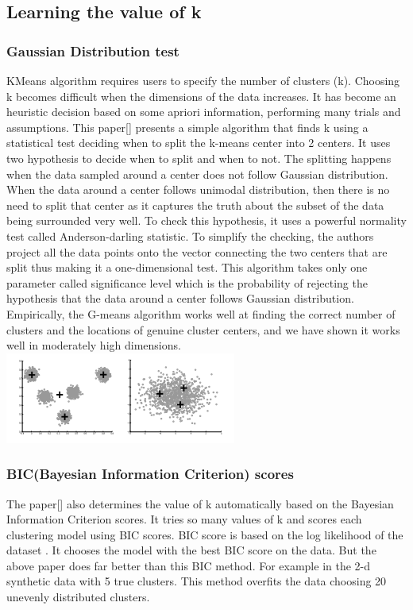 \documentclass[conference]{IEEEtran}
\begin{document}
\subsection{Learning the value of k }
\subsubsection{Gaussian Distribution test}
KMeans algorithm requires users to specify the number of clusters (k). Choosing k becomes difficult when the dimensions of the data increases. It has become an heuristic decision based on some apriori information, performing many trials and assumptions. This paper[] presents a simple algorithm that finds k using a statistical test deciding when to split the k-means center into 2 centers. It uses two hypothesis to decide when to split and when to not. The splitting happens when the data sampled around a center does not follow Gaussian distribution. When the data around a center follows unimodal distribution, then there is no need to split that center as it captures the truth about the subset of the data being surrounded very well. To check this hypothesis, it uses a powerful normality test called Anderson-darling statistic. To simplify the checking, the authors project all the data points onto the vector connecting the two centers that are split thus making it a one-dimensional test. This algorithm takes only one parameter called significance level which is the probability of rejecting the hypothesis that the data around a center follows Gaussian distribution. Empirically, the G-means algorithm works well at ﬁnding the correct number of clusters and the locations of genuine cluster centers, and we have shown it works well in moderately high dimensions.
\includegraphics[scale =0.80]{GMeans.png}


\subsubsection{ BIC(Bayesian Information Criterion) scores}
The paper[] also determines the value of k automatically based on the Bayesian Information Criterion scores. It tries so many values of k and scores each clustering model using BIC scores. BIC score is based on the log likelihood of the dataset . It chooses the model with the best BIC score on the data. But the above paper does far better than this BIC method. For example in the 2-d synthetic data with 5 true clusters. This method overfits the data choosing 20 unevenly distributed clusters. 
\end{document}
